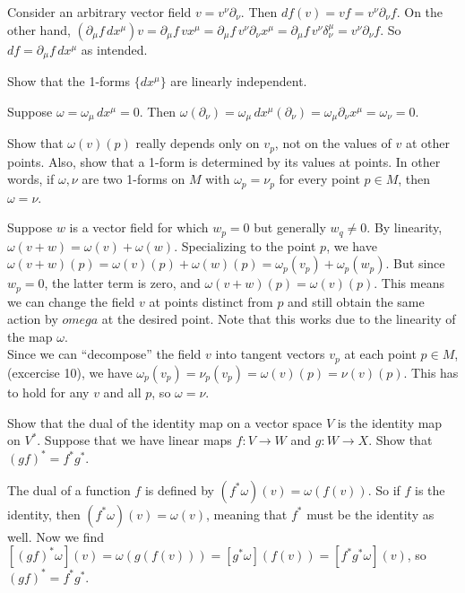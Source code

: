 Consider an arbitrary vector field $v=v^\nu \partial_\nu$. Then $df(v)=vf=v^\nu \partial_\nu f$. On the other hand, $(\partial_\mu f\,dx^\mu)v=\partial_\mu f\, vx^\mu=\partial_\mu f\, v^\nu\partial_\nu x^\mu=\partial_\mu f\, v^\nu \delta_\nu^\mu=v^\nu \partial_\nu f$. 
So $df=\partial_\mu f\,dx^\mu$ as intended.

{\begin{p}{Show that the 1-forms $\{dx^\mu\}$ are linearly independent.}
\end{p}

Suppose $\omega=\omega_\mu\,dx^\mu=0$. Then $\omega(\partial_\nu)=\omega_\mu\,dx^\mu(\partial_\nu)=\omega_\mu \partial_\nu x^\mu
=\omega_\nu=0$.

\begin{p}{Show that $\omega(v)(p)$ really depends only on $v_p$, not on 
the values of $v$ at other points. Also, show that a 1-form is determined by its values at points.
In other words, if $\omega, \nu$ are two 1-forms on $M$ with $\omega_p=\nu_p$ for 
every point $p\in M$, then $\omega=\nu$. }
\end{p}

Suppose $w$ is a vector field for which $w_p=0$ but generally $w_q\neq 0$. By linearity, $\omega(v+w)=\omega(v)+\omega(w)$. 
Specializing to the point $p$, we have $\omega(v+w)(p)=\omega(v)(p)+\omega(w)(p)=\omega_p(v_p)+\omega_p(w_p)$. But
since $w_p=0$, the latter term is zero, and $\omega(v+w)(p)=\omega(v)(p)$. This means we can change the field $v$ at points
distinct from $p$ and still obtain the same action by $omega$ at the desired point. Note that this works due to the linearity of the
map $\omega$.\\

Since we can ``decompose'' the field $v$ into tangent vectors $v_p$ at each point $p\in M$, (excercise 10), we have 
$\omega_p(v_p)=\nu_p(v_p) = \omega(v)(p)=\nu(v)(p)$. This has to hold for any $v$ and all $p$, so $\omega=\nu$.\\

\begin{p}{Show that the dual of the identity map on a vector space $V$ is the identity map on $V^*$. Suppose
that we have linear maps $f:V\rightarrow W$ and $g:W\rightarrow X$. Show that $(gf)^*=f^*g^*$. }
\end{p}

The dual of a function $f$ is defined by $(f^*\omega)(v)=\omega(f(v))$. So if $f$ is the identity, then $(f^*\omega)(v)=\omega(v)$,
meaning that $f^*$ must be the identity as well. 
Now we find $[(gf)^*\omega](v)=\omega(g(f(v)))=[g^*\omega](f(v))=[f^*g^*\omega](v)$,
so  $(gf)^*=f^*g^*$.

}
